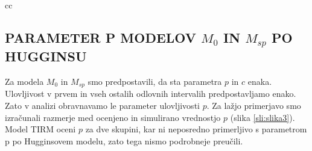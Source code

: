 \begin{table}[!htb]
\begin{tabular}{cc}
    \begin{minipage}{.33\linewidth}
      \caption*{Normalna funkcija}
    \end{minipage}%

    \begin{minipage}{.33\linewidth}
      \caption*{Razlike med matrikama}
    \end{minipage}
\end{tabular}
\end{table}

\subsection{PARAMETER P MODELOV $M_0$ IN $M_{sp}$ PO HUGGINSU}
Za modela $M_0$ in $M_{sp}$ smo predpostavili, da sta parametra $p$ in $c$ enaka. Ulovljivost v prvem in vseh ostalih odlovnih intervalih predpostavljamo enako. Zato v analizi obravnavamo le parameter ulovljivosti $p$. Za lažjo primerjavo smo izračunali razmerje med ocenjeno in simulirano vrednostjo $p$ (slika \ref{sli:slika3}). Model TIRM oceni $p$ za dve skupini, kar ni neposredno primerljivo s parametrom p po Hugginsovem modelu, zato tega nismo podrobneje preučili.

